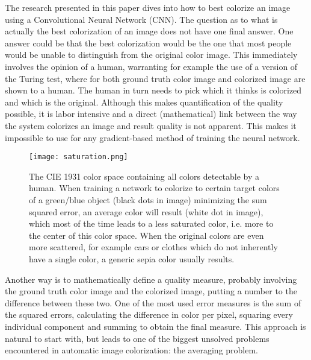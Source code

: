 The research presented in this paper dives into how to best colorize an image using a Convolutional Neural Network (CNN). The question as to what is actually the best colorization of an image does not have one final answer. 
One answer could be that the best colorization would be the one that most people would be unable to distinguish from the original color image. This immediately involves the opinion of a human, warranting for example the use of a version of the Turing test, where for both ground truth color image and colorized image are shown to a human. The human in turn needs to pick which it thinks is colorized and which is the original. 
Although this makes quantification of the quality possible, it is labor intensive and a direct (mathematical) link between the way the system colorizes an image and result quality is not apparent. This makes it impossible to use for any gradient-based method of training the neural network. 

\begin{wrapfigure}{R}{0.37\textwidth}
	\vspace{-20pt}
	\begin{center}
		\texttt{[image: saturation.png]}
	\end{center}
	\caption{\label{fig:colorspacesaturation} The CIE 1931 color space containing all colors detectable by a human. When training a network to colorize to certain target colors of a green/blue object (black dots in image) minimizing the sum squared error, an average color will result (white dot in image), which most of the time leads to a less saturated color, i.e. more to the center of this color space. When the original colors are even more scattered, for example cars or clothes which do not inherently have a single color, a generic sepia color usually results.}
	\vspace{-20pt}
\end{wrapfigure}

Another way is to mathematically define a quality measure, probably involving the ground truth color image and the colorized image, putting a number to the difference between these two. 
One of the most used error measures is the sum of the squared errors, calculating the difference in color per pixel, squaring every individual component and summing to obtain the final measure. 
This approach is natural to start with, but leads to one of the biggest unsolved problems encountered in automatic image colorization: the averaging problem.

